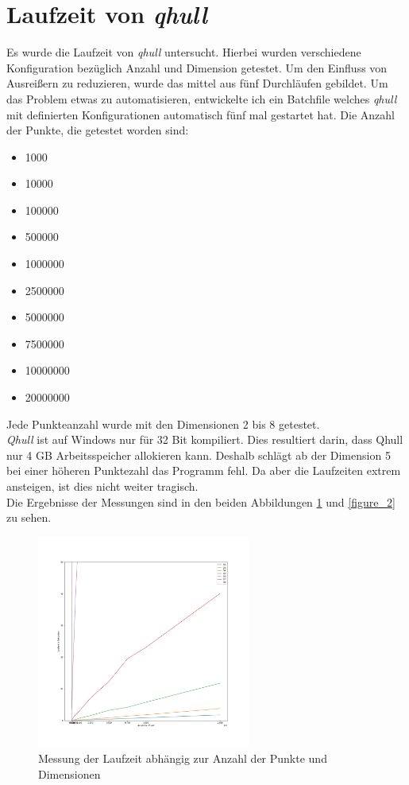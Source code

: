\documentclass[conference]{IEEEtran}
\begin{document}
	\section{Laufzeit von \textit{qhull}}
	Es wurde die Laufzeit von \textit{qhull} untersucht. Hierbei wurden verschiedene Konfiguration bezüglich Anzahl und Dimension getestet. Um den Einfluss von Ausreißern zu reduzieren, wurde das mittel aus fünf Durchläufen gebildet. Um das Problem etwas zu automatisieren, entwickelte ich ein Batchfile welches \textit{qhull} mit definierten Konfigurationen automatisch fünf mal gestartet hat. Die Anzahl der Punkte, die getestet worden sind:
	\begin{itemize}
		\item 1000
		\item 10000
		\item 100000
		\item 500000
		\item 1000000
		\item 2500000
		\item 5000000
		\item 7500000
		\item 10000000
		\item 20000000
	\end{itemize}
	Jede Punkteanzahl wurde mit den Dimensionen 2 bis 8 getestet.\\
	\textit{Qhull} ist auf Windows nur für 32 Bit kompiliert. Dies resultiert darin, dass Qhull nur 4 GB Arbeitsspeicher allokieren kann. Deshalb schlägt ab der Dimension 5 bei einer höheren Punktezahl das Programm fehl. Da aber die Laufzeiten extrem ansteigen, ist dies nicht weiter tragisch.\\
	Die Ergebnisse der Messungen sind in den beiden Abbildungen \ref{figure_1} und \ref{figure_2} zu sehen.\\
	\begin{figure}[h!]
		\begin{center}
			\includegraphics[width=7cm]{Laufzeit.png}
			\caption{Messung der Laufzeit abhängig zur Anzahl der Punkte und Dimensionen}
			\label{figure_1}
		\end{center}
	\end{figure}
\end{document}
